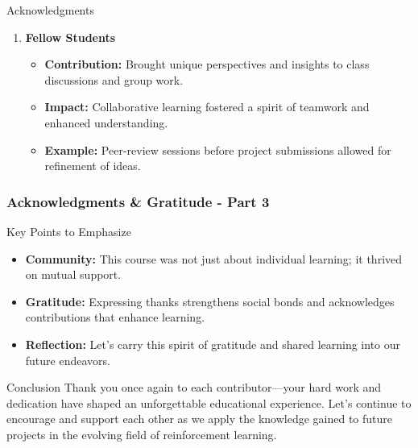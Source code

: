\documentclass[aspectratio=169]{beamer}
\begin{document}
\begin{frame}[fragile]
\begin{block}{Acknowledgments}
\begin{enumerate}
            \item \textbf{Fellow Students}
            \begin{itemize}
                \item \textbf{Contribution:} Brought unique perspectives and insights to class discussions and group work.
                \item \textbf{Impact:} Collaborative learning fostered a spirit of teamwork and enhanced understanding.
                \item \textbf{Example:} Peer-review sessions before project submissions allowed for refinement of ideas.
            \end{itemize}
        \end{enumerate}
    \end{block}
\end{frame}

\begin{frame}[fragile]
    \frametitle{Acknowledgments \& Gratitude - Part 3}
    \begin{block}{Key Points to Emphasize}
        \begin{itemize}
            \item \textbf{Community:} This course was not just about individual learning; it thrived on mutual support.
            \item \textbf{Gratitude:} Expressing thanks strengthens social bonds and acknowledges contributions that enhance learning.
            \item \textbf{Reflection:} Let's carry this spirit of gratitude and shared learning into our future endeavors.
        \end{itemize}
    \end{block}

    \begin{block}{Conclusion}
        Thank you once again to each contributor—your hard work and dedication have shaped an unforgettable educational experience. 
        Let’s continue to encourage and support each other as we apply the knowledge gained to future projects in the evolving field of reinforcement learning.
    \end{block}
\end{frame}
\end{document}
